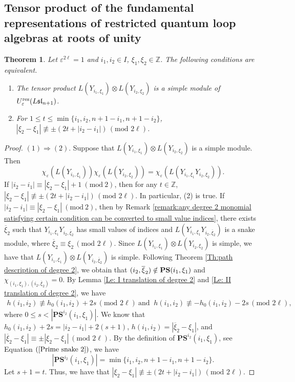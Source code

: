 \documentclass[12pt, reqno]{amsart}
\newtheorem{theorem}{Theorem}[section]
\numberwithin{equation}{section}
\newcommand{\ZZ}{\mathbb{Z}}
\newcommand{\res}{{\rm res}}
\begin{document}
{\subsection{Tensor product of the fundamental representations of restricted quantum loop algebras at roots of unity}\label{tensor products}

\begin{theorem}\label{Th: tensor product}
Let $\varepsilon^{2 \ell}=1$ and $i_{1}, i_{2}\in I$, $\xi_{1}, \xi_{2}\in \mathbb{Z}$. The following conditions are equivalent.
\begin{enumerate}
\item The tensor product $L(Y_{i_1,\xi_1})\otimes L(Y_{i_2,\xi_2})$ is a simple module of $U_{\varepsilon}^{\res}(L\mathfrak{sl}_{n+1})$.
\item For $1\leq t\leq \min\{i_1, i_2, n+1-i_1, n+1-i_2\}$, $|\xi_{2}-\xi_1| \not\equiv \pm(2t+|i_2-i_1|)\,(\text{mod } 2 \ell)$.
\end{enumerate}
\end{theorem}

\begin{proof}
$(1)\Rightarrow(2)$. Suppose that $L(Y_{i_1,\xi_1})\otimes L(Y_{i_2,\xi_2})$ is a simple module. Then
\[
\chi_\varepsilon(L(Y_{i_1,\xi_1})) \chi_\varepsilon(L(Y_{i_2,\xi_2}))=\chi_\varepsilon(L(Y_{i_1,\xi_1}Y_{i_2,\xi_2})).
\]
If $|i_2-i_1|\equiv |\xi_2-\xi_1|+1\ (\text{mod}\ 2)$, then for any $t \in \ZZ$, $|\xi_{2}-\xi_1| \not\equiv \pm(2t+|i_2-i_1|)\,(\text{mod } 2 \ell)$. In particular, (2) is true. If $|i_2-i_1|\equiv |\xi_2-\xi_1|\ (\text{mod}\ 2)$, then by Remark \ref{remark:any degree 2 monomial satisfying certain condition can be converted to small value indices}, there exists $\overline{\xi}_2$ such that $Y_{i_1,\xi_1}Y_{i_2,\overline{\xi}_2}$ has small values of indices and $L(Y_{i_1,\xi_1}Y_{i_2,\overline{\xi}_2})$ is a snake module, where $\overline{\xi}_2\equiv \xi_2\,(\text{mod } 2 \ell)$. Since $L(Y_{i_1,\xi_1})\otimes L(Y_{i_2,\xi_2})$ is simple, we have that $L(Y_{i_1,\xi_1})\otimes L(Y_{i_2,\overline{\xi}_2})$ is simple. Following Theorem \ref{Th:path description of degree 2}, we obtain that $(i_2,\overline{\xi}_2) \notin {\bf PS}(i_1,\xi_1)$ and
$\chi_{(i_1,\xi_1),(i_{2},\overline{\xi}_2)}=0$. By Lemma \ref{Le: I translation of degree 2} and \ref{Le: II translation of degree 2}, we have
\begin{align*}
h(i_1,i_2) \not\equiv h_{0}(i_1,i_2)+2s\,(\text{mod } 2 \ell) \ \text{and } \  h(i_1,i_2) \not\equiv -h_{0}(i_1,i_2)-2s\,(\text{mod } 2 \ell),
\end{align*}
where $0\leq s<|\mathbf{PS}^{i_2}(i_1,\xi_1)|$. We know that $h_{0}(i_1,i_2)+2s=|i_2-i_1|+2(s+1)$, $h(i_1,i_2)=|\overline{\xi}_2-\xi_1|$, and $|\overline{\xi}_2-\xi_1|\equiv \pm|\xi_2-\xi_1|\,(\text{mod } 2 \ell)$. By the definition of $\mathbf{PS}^{i_2}(i_1,\xi_1)$, see Equation $(\ref{Prime snake 2})$, we have
\[
|\mathbf{PS}^{i_2}(i_1,\xi_1)|= \min\{i_1, i_2, n+1-i_1, n+1-i_2\}.
\]
Let $s+1=t$. Thus, we have that $|\xi_2-\xi_1| \not\equiv \pm(2t+|i_2-i_1|)\,(\text{mod } 2 \ell)$.



\end{proof}}
\end{document}
